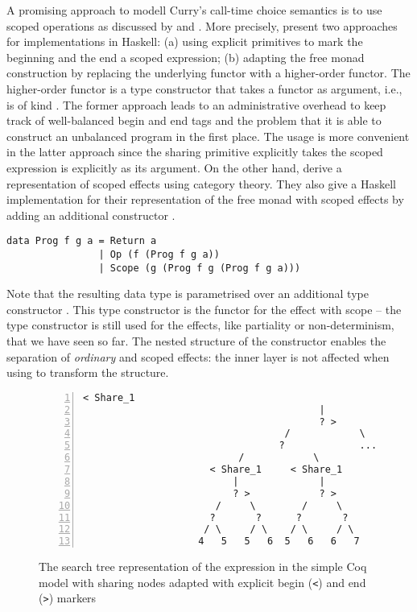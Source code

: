 A promising approach to modell Curry's call-time choice semantics is to use scoped operations as discussed by \citet{wu2014effect} and \citet{pirog2018syntax}.
More precisely, \citeauthor{wu2014effect} present two approaches for implementations in Haskell: (a) using explicit primitives to mark the beginning and the end a scoped expression; (b) adapting the free monad construction by replacing the underlying functor with a higher-order functor.
The higher-order functor is a type constructor that takes a functor as argument, i.e., is of kind \hinl{(* -> *) -> * -> *}.
The former approach leads to an administrative overhead to keep track of well-balanced begin and end tags and the problem that it is able to construct an unbalanced program in the first place.
The usage is more convenient in the latter approach since the sharing primitive explicitly takes the scoped expression is explicitly as its argument.
On the other hand, \citeauthor{pirog2018syntax} derive a representation of scoped effects using category theory.
They also give a Haskell implementation for their representation of the free monad with scoped effects by adding an additional constructor .

\begin{verbatim}
data Prog f g a = Return a
                | Op (f (Prog f g a))
                | Scope (g (Prog f g (Prog f g a)))
\end{verbatim}

Note that the resulting data type  is parametrised over an additional type constructor .
This type constructor is the functor for the effect with scope -- the type constructor  is still used for the effects, like partiality or non-determinism, that we have seen so far.
The nested structure of the  constructor enables the separation of \emph{ordinary} and scoped effects: the inner  layer is not affected when using \hinl{(>>=)} to transform the structure.

\begin{figure}[tb]
 \centering
\begin{Verbatim}[numbers=left, xleftmargin=5mm]
                                     < Share_1
                                         |
                                         ? >
                                   /            \
                                  ?             ...
                           /            \
                      < Share_1     < Share_1
                          |              |
                          ? >            ? >
                       /     \        /     \
                      ?       ?      ?       ?
                     / \     / \    / \     / \
                    4   5   5   6  5   6   6   7
\end{Verbatim}
\caption{The search tree representation of the expression  in the simple Coq model with sharing nodes adapted with explicit begin (\texttt{<}) and end (\texttt{>}) markers}
\label{fig:searchTreeScope}
\end{figure}

